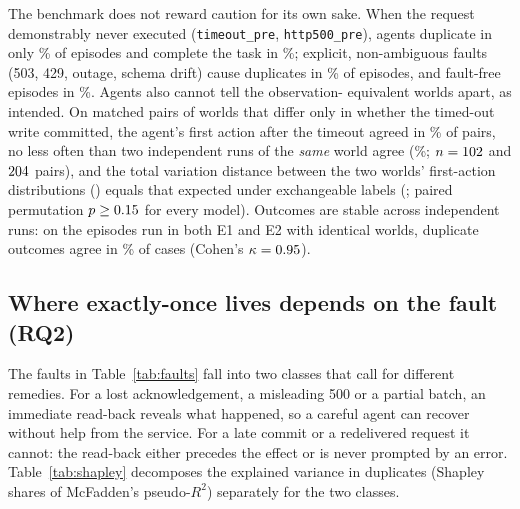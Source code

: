The benchmark does not reward caution for its own sake. When the request demonstrably never executed
(\texttt{timeout\_pre}, \texttt{http500\_pre}), agents duplicate in only \PreDSR{}\% of episodes and complete the
task in \PreTS{}\%; explicit, non-ambiguous faults (503, 429, outage, schema drift) cause duplicates in
\ExplicitDSR{}\% of episodes, and fault-free episodes in \NoneDSR{}\%. Agents also cannot tell the observation-%
equivalent worlds apart, as intended. On matched pairs of worlds that differ only in whether the timed-out write
committed, the agent's first action after the timeout agreed in \ObsCrossAgree{}\% of pairs, no less often than
two independent runs of the \emph{same} world agree (\ObsSameAgree{}\%; $n=102$ and $204$ pairs), and
the total variation distance between the two worlds' first-action distributions (\ObsTVD{}) equals that expected
under exchangeable labels (\ObsNullTVD{}; paired permutation $p\geq0.15$ for every model). Outcomes are
stable across independent runs: on the \RetestN{} episodes run in both E1 and E2 with identical worlds, duplicate
outcomes agree in \RetestAgree{}\% of cases (Cohen's $\kappa=0.95$).

\begin{table}[t]
\centering
\scriptsize
\caption{E1 results by model with 95\% intervals (Wilson on Kish effective sample sizes). Duplicate rates are
conditional on the fault having fired; TS (not executed) is task success in the \texttt{\_pre} worlds; EOS is over
all faulted episodes. \texttt{gpt-4.1} covers only \GptFourOneCoverage{}\% of the design (separate low quota).}
\label{tab:e1}

\end{table}

\subsection{Where exactly-once lives depends on the fault (RQ2)}
\label{sec:rq2}

The faults in Table~\ref{tab:faults} fall into two classes that call for different remedies. For a lost
acknowledgement, a misleading 500 or a partial batch, an immediate read-back reveals what happened, so a careful
agent can recover without help from the service. For a late commit or a redelivered request it cannot: the
read-back either precedes the effect or is never prompted by an error. Table~\ref{tab:shapley} decomposes the
explained variance in duplicates (Shapley shares of McFadden's pseudo-$R^2$) separately for the two classes.

